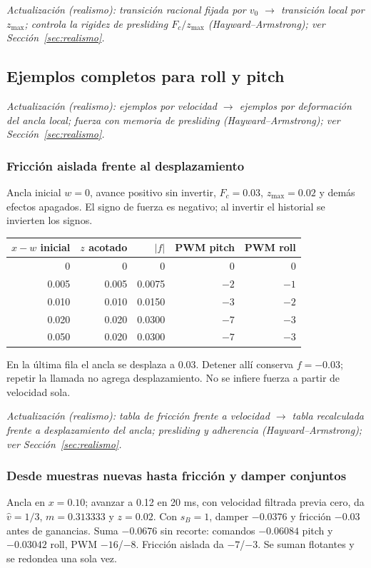 \documentclass[11pt,a4paper]{article}
\begin{document}
\textit{Actualización (realismo): transición racional fijada por $v_0$ $\rightarrow$ transición local por $z_{\max}$; controla la rigidez de presliding $F_c/z_{\max}$ (Hayward--Armstrong); ver Sección~\ref{sec:realismo}.}

\subsection{Ejemplos completos para roll y pitch}

\textit{Actualización (realismo): ejemplos por velocidad $\rightarrow$ ejemplos por deformación del ancla local; fuerza con memoria de presliding (Hayward--Armstrong); ver Sección~\ref{sec:realismo}.}

\subsubsection{Fricción aislada frente al desplazamiento}
Ancla inicial $w=0$, avance positivo sin invertir, $F_c=0.03$, $z_{\max}=0.02$ y demás efectos apagados. El signo de fuerza es negativo; al invertir el historial se invierten los signos.
\begin{center}\begin{tabular}{rrrrr}
\toprule $x-w$ inicial&$z$ acotado&$|f|$&PWM pitch&PWM roll\\\midrule
0&0&0&0&0\\
0.005&0.005&0.0075&$-2$&$-1$\\
0.010&0.010&0.0150&$-3$&$-2$\\
0.020&0.020&0.0300&$-7$&$-3$\\
0.050&0.020&0.0300&$-7$&$-3$\\
\bottomrule\end{tabular}\end{center}
En la última fila el ancla se desplaza a 0.03. Detener allí conserva $f=-0.03$; repetir la llamada no agrega desplazamiento. No se infiere fuerza a partir de velocidad sola.

\textit{Actualización (realismo): tabla de fricción frente a velocidad $\rightarrow$ tabla recalculada frente a desplazamiento del ancla; presliding y adherencia (Hayward--Armstrong); ver Sección~\ref{sec:realismo}.}

\subsubsection{Desde muestras nuevas hasta fricción y damper conjuntos}
Ancla en $x=0.10$; avanzar a 0.12 en 20 ms, con velocidad filtrada previa cero, da $\widehat v=1/3$, $m=0.313333$ y $z=0.02$. Con $s_B=1$, damper $-0.0376$ y fricción $-0.03$ antes de ganancias. Suma $-0.0676$ sin recorte: comandos $-0.06084$ pitch y $-0.03042$ roll, PWM $-16$/$-8$. Fricción aislada da $-7$/$-3$. Se suman flotantes y se redondea una sola vez.
\end{document}
